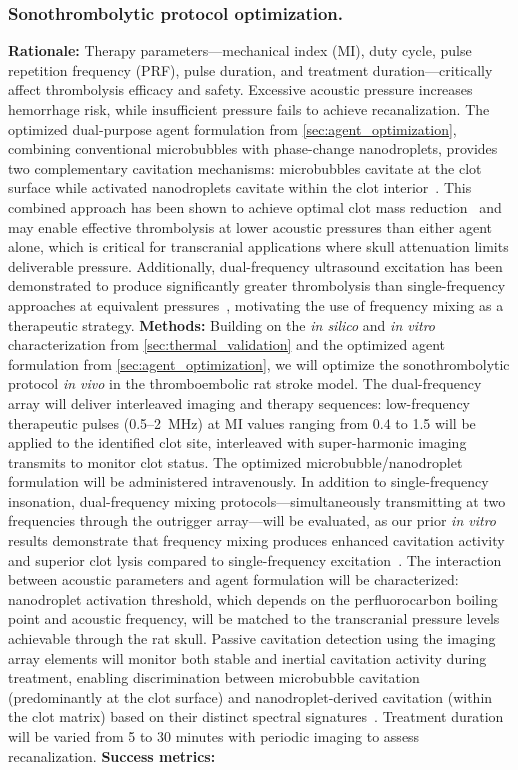 \subsubsection{Sonothrombolytic protocol optimization.\label{sec:sono_optimization}}
\textbf{Rationale:} Therapy parameters---mechanical index (MI), duty cycle, pulse repetition frequency (PRF), pulse duration, and treatment duration---critically affect thrombolysis efficacy and safety. Excessive acoustic pressure increases hemorrhage risk, while insufficient pressure fails to achieve recanalization. The optimized dual-purpose agent formulation from \ref{sec:agent_optimization}, combining conventional microbubbles with phase-change nanodroplets, provides two complementary cavitation mechanisms: microbubbles cavitate at the clot surface while activated nanodroplets cavitate within the clot interior~\cite{kim2022analysis,kim2020comparison}. This combined approach has been shown to achieve optimal clot mass reduction~\cite{kim2022analysis} and may enable effective thrombolysis at lower acoustic pressures than either agent alone, which is critical for transcranial applications where skull attenuation limits deliverable pressure. Additionally, dual-frequency ultrasound excitation has been demonstrated to produce significantly greater thrombolysis than single-frequency approaches at equivalent pressures~\cite{wu2021dual}, motivating the use of frequency mixing as a therapeutic strategy. \textbf{Methods:} Building on the \textit{in silico} and \textit{in vitro} characterization from \ref{sec:thermal_validation} and the optimized agent formulation from \ref{sec:agent_optimization}, we will optimize the sonothrombolytic protocol \textit{in vivo} in the thromboembolic rat stroke model. The dual-frequency array will deliver interleaved imaging and therapy sequences: low-frequency therapeutic pulses (0.5--2~MHz) at MI values ranging from 0.4 to 1.5 will be applied to the identified clot site, interleaved with super-harmonic imaging transmits to monitor clot status. The optimized microbubble/nanodroplet formulation will be administered intravenously. In addition to single-frequency insonation, dual-frequency mixing protocols---simultaneously transmitting at two frequencies through the outrigger array---will be evaluated, as our prior \textit{in vitro} results demonstrate that frequency mixing produces enhanced cavitation activity and superior clot lysis compared to single-frequency excitation~\cite{wu2021dual}. The interaction between acoustic parameters and agent formulation will be characterized: nanodroplet activation threshold, which depends on the perfluorocarbon boiling point and acoustic frequency, will be matched to the transcranial pressure levels achievable through the rat skull. Passive cavitation detection using the imaging array elements will monitor both stable and inertial cavitation activity during treatment, enabling discrimination between microbubble cavitation (predominantly at the clot surface) and nanodroplet-derived cavitation (within the clot matrix) based on their distinct spectral signatures~\cite{kim2022analysis,kim2020comparison}. Treatment duration will be varied from 5 to 30 minutes with periodic imaging to assess recanalization. \textbf{Success metrics:} 